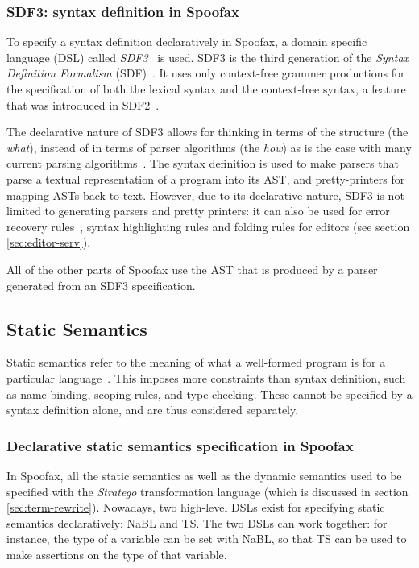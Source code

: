 \subsubsection{SDF3: syntax definition in Spoofax}
\label{sec:orgheadline1}
To specify a syntax definition declaratively in Spoofax, a domain
specific language (DSL) called \emph{SDF3}~\cite{Vollebregt12} is used.
SDF3 is the third generation of the \emph{Syntax Definition Formalism}
(SDF)~\cite{Heering89}. It uses only context-free grammer
productions for the specification of both the lexical syntax and the
context-free syntax, a feature that was introduced in
SDF2~\cite{Visser97}.

The declarative nature of SDF3 allows for thinking in terms of the
structure (the \emph{what}), instead of in terms of parser algorithms (the
\emph{how}) as is the case with many current parsing
algorithms~\cite{Kats10b}. The syntax definition is used to make
parsers that parse a textual representation of a program into its AST,
and pretty-printers for mapping ASTs back to text. However, due to its
declarative nature, SDF3 is not limited to generating parsers and
pretty printers: it can also be used for error recovery
rules~\cite{deJonge12}, syntax highlighting rules and folding
rules for editors (see section \ref{sec:editor-serv}).

All of the other parts of Spoofax use the AST that is produced by a
parser generated from an SDF3 specification.
\subsection{Static Semantics}
\label{sec:static-analysis}
Static semantics refer to the meaning of what a well-formed program is
for a particular language~\cite{Milner97}. This imposes more
constraints than syntax definition, such as name binding, scoping
rules, and type checking. These cannot be specified by a syntax
definition alone, and are thus considered separately.
\subsubsection{Declarative static semantics specification in Spoofax}
\label{sec:orgheadline2}
In Spoofax, all the static semantics as well as the dynamic semantics
used to be specified with the \emph{Stratego} transformation language
(which is discussed in section \ref{sec:term-rewrite}). Nowadays, two
high-level DSLs exist for specifying static semantics declaratively:
NaBL and TS. The two DSLs can work together: for instance, the type of
a variable can be set with NaBL, so that TS can be used to make
assertions on the type of that variable.
